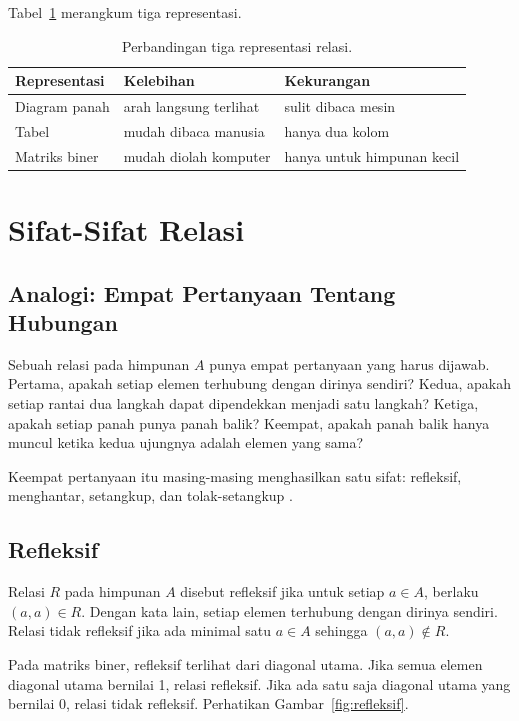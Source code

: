 \documentclass[11pt,a4paper]{article}
\begin{document}
Tabel~\ref{tab:representasi} merangkum tiga representasi.

\begin{table}[H]
	\centering
	\caption{Perbandingan tiga representasi relasi.}
	\label{tab:representasi}
	\small
	\begin{tabularx}{\textwidth}{l X X}
		\toprule
		Representasi  & Kelebihan              & Kekurangan                 \\
		\midrule
		Diagram panah & arah langsung terlihat & sulit dibaca mesin         \\
		Tabel         & mudah dibaca manusia   & hanya dua kolom            \\
		Matriks biner & mudah diolah komputer  & hanya untuk himpunan kecil \\
		\bottomrule
	\end{tabularx}
\end{table}

\section{Sifat-Sifat Relasi}

\subsection{Analogi: Empat Pertanyaan Tentang Hubungan}

Sebuah relasi pada himpunan $A$ punya empat pertanyaan yang harus dijawab. Pertama, apakah setiap elemen terhubung dengan dirinya sendiri? Kedua, apakah setiap rantai dua langkah dapat dipendekkan menjadi satu langkah? Ketiga, apakah setiap panah punya panah balik? Keempat, apakah panah balik hanya muncul ketika kedua ujungnya adalah elemen yang sama?

Keempat pertanyaan itu masing-masing menghasilkan satu sifat: refleksif, menghantar, setangkup, dan tolak-setangkup \cite{rosen}.

\subsection{Refleksif}

Relasi $R$ pada himpunan $A$ disebut refleksif jika untuk setiap $a \in A$, berlaku $(a,a) \in R$. Dengan kata lain, setiap elemen terhubung dengan dirinya sendiri. Relasi tidak refleksif jika ada minimal satu $a \in A$ sehingga $(a,a) \notin R$.

Pada matriks biner, refleksif terlihat dari diagonal utama. Jika semua elemen diagonal utama bernilai 1, relasi refleksif. Jika ada satu saja diagonal utama yang bernilai 0, relasi tidak refleksif. Perhatikan Gambar~\ref{fig:refleksif}.
\end{document}
